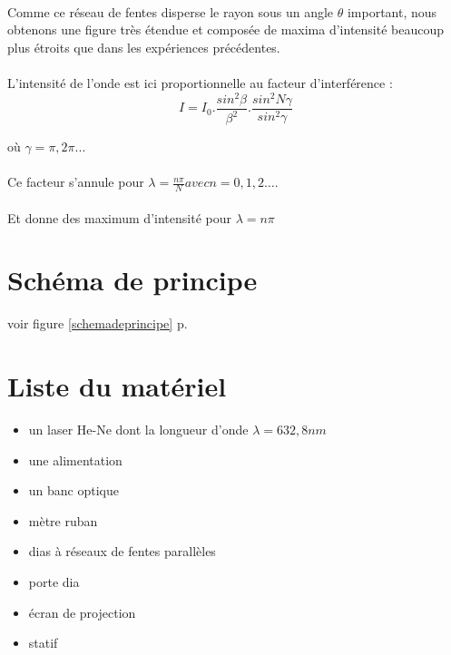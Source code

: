 \documentclass[11pt,a4paper]{report}
\begin{document}
\paragraph{}
Comme ce réseau de fentes disperse le rayon sous un angle $\theta$ important, nous obtenons une figure très étendue et composée de maxima d'intensité beaucoup plus étroits que dans les expériences précédentes.
\paragraph{}
L'intensité de l'onde est ici proportionnelle  au facteur d'interférence :
\begin{equation}
I = I_{0}.\frac{sin^2 \beta}{\beta^2}.\frac{sin^2N\gamma}{sin^2 \gamma}
\end{equation}
\begin{center}
où $\gamma = \pi, 2\pi...$
\end{center}

\paragraph{}
Ce facteur s'annule pour $\lambda = \frac{n\pi} {N} avec n=0,1,2…. $
\paragraph{}
Et donne des maximum d’intensité pour $\lambda = n\pi$

	\section{Schéma de principe}
	voir figure \ref{schemadeprincipe} p.\pageref{schemadeprincipe}
	\section{Liste du matériel}
	\begin{itemize}
	\item un laser He-Ne dont la longueur d'onde $\lambda = 632,8nm$
	\item une alimentation
	\item un banc optique
	\item mètre ruban
	\item dias à réseaux de fentes parallèles
	\item porte dia
	\item écran de projection
	\item statif
	\end{itemize}
\end{document}
